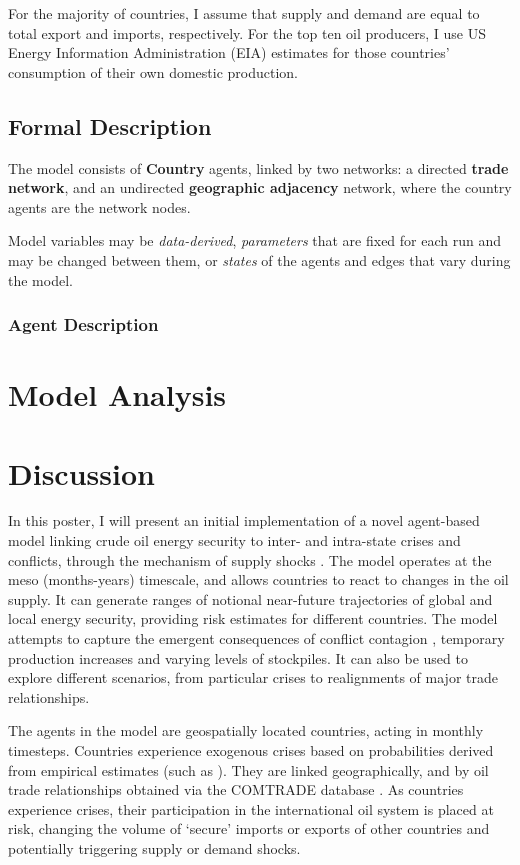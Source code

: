 \documentclass{article}
\begin{document}
For the majority of countries, I assume that supply and demand are equal to total export and imports, respectively. For the top ten oil producers, I use US Energy Information Administration (EIA) estimates \citep{} for those countries' consumption of their own domestic production. 

\subsection{Formal Description}

The model consists of \textbf{Country} agents, linked by two networks: a directed \textbf{trade network}, and an undirected \textbf{geographic adjacency} network, where the country agents are the network nodes.

Model variables may be \emph{data-derived}, \emph{parameters} that are fixed for each run and may be changed between them, or \emph{states} of the agents and edges that vary during the model. 

\subsubsection{Agent Description}

\section{Model Analysis}

\section{Discussion}



In this poster, I will present an initial implementation of a novel agent-based model linking crude oil energy security to inter- and intra-state crises and conflicts, through the mechanism of supply shocks \citep{kilian_2008}. The model operates at the meso (months-years) timescale, and allows countries to react to changes in the oil supply. It can generate ranges of notional near-future trajectories of global and local energy security, providing risk estimates for different countries. The model attempts to capture the emergent consequences of conflict contagion \citep{black_2013}, temporary production increases and varying levels of stockpiles. It can also be used to explore different scenarios, from particular crises to realignments of major trade relationships. 

The agents in the model are geospatially located countries, acting in monthly timesteps. Countries experience exogenous crises based on probabilities derived from empirical estimates (such as \citep{goldstone_2005,eiu_2013,ward_2013}). They are linked geographically, and by oil trade relationships obtained via the COMTRADE database \citep{un_2013}. As countries experience crises, their participation in the  international oil system is placed at risk, changing the volume of `secure' imports or exports of other countries and  potentially triggering supply or demand shocks. 
\end{document}
